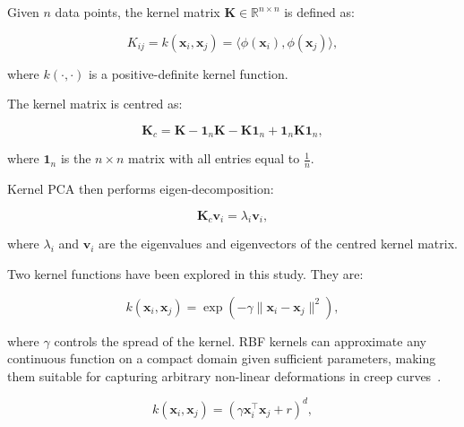 \documentclass[class=scrbook, crop=false]{standalone}
\begin{document}
	Given $n$ data points, the kernel matrix $\mathbf{K} \in \mathbb{R}^{n \times n}$ is defined as:
	
	\begin{equation}
		K_{ij} = k(\mathbf{x}_i, \mathbf{x}_j) = \langle \phi(\mathbf{x}_i), \phi(\mathbf{x}_j) \rangle,
		\label{eq:kernel_matrix}
	\end{equation}
	
	where $k(\cdot, \cdot)$ is a positive-definite kernel function.
	
	The kernel matrix is centred as:
	
	\begin{equation}
		\mathbf{K}_c = \mathbf{K} - \mathbf{1}_n \mathbf{K} - \mathbf{K} \mathbf{1}_n + \mathbf{1}_n \mathbf{K} \mathbf{1}_n,
		\label{eq:centered_kernel}
	\end{equation}
	
	where $\mathbf{1}_n$ is the $n \times n$ matrix with all entries equal to $\frac{1}{n}$.
	
	Kernel PCA then performs eigen-decomposition:
	
	\begin{equation}
		\mathbf{K}_c \mathbf{v}_i = \lambda_i \mathbf{v}_i,
		\label{eq:kpca_eigendecomposition}
	\end{equation}
	
	where $\lambda_i$ and $\mathbf{v}_i$ are the eigenvalues and eigenvectors of the centred kernel matrix.
		
	Two kernel functions have been explored in this study. They are:
	
	
	\begin{equation}
		k(\mathbf{x}_i, \mathbf{x}_j) = \exp\left(-\gamma \|\mathbf{x}_i - \mathbf{x}_j\|^2\right),
		\label{eq:rbf_kernel}
	\end{equation}
	
	where $\gamma$ controls the spread of the kernel. RBF kernels can approximate any continuous function on a compact domain given sufficient parameters, making them suitable for capturing arbitrary non-linear deformations in creep curves~\cite{steinwart2002influence}.
	
	
	\begin{equation}
		k(\mathbf{x}_i, \mathbf{x}_j) = (\gamma \mathbf{x}_i^\top \mathbf{x}_j + r)^d,
		\label{eq:poly_kernel}
	\end{equation}
	
\end{document}
